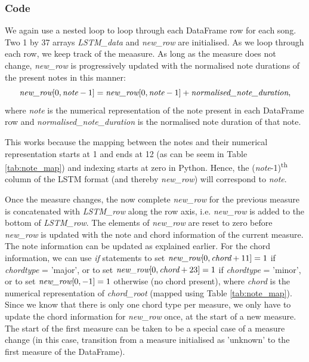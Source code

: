 \subsubsection{Code}
We again use a nested loop to loop through each DataFrame row for each song. Two 1 by 37 arrays \emph{LSTM\_data} and \emph{new\_row} are initialised. As we loop through each row, we keep track of the meaasure. As long as the measure does not change, \emph{new\_row} is progressively updated with the normalised note durations of the present notes in this manner: 
\begin{equation}  
\emph{new\_row}[0,\emph{note}-1] = \emph{new\_row}[0,\emph{note}-1] + \emph{normalised\_note\_duration},
\end{equation}
where \emph{note} is the numerical representation of the note present in each DataFrame row and \emph{normalised\_note\_duration} is the normalised note duration of that note. 

This works because the mapping between the notes and their numerical representation starts at 1 and ends at 12 (as can be seem in Table \ref{tab:note_map}) and indexing starts at zero in Python. Hence, the (\emph{note}-1)\textsuperscript{th} column of the LSTM format (and thereby \emph{new\_row}) will correspond to \emph{note}.

Once the measure changes, the now complete \emph{new\_row} for the previous measure is concatenated with \emph{LSTM\_row} along the row axis, i.e. \emph{new\_row} is added to the bottom of \emph{LSTM\_row}. The elements of \emph{new\_row} are reset to zero before \emph{new\_row} is updated with the note and chord information of the current measure. The note information can be updated as explained earlier. For the chord information, we can use \emph{if} statements to set $\emph{new\_row}[0, \emph{chord}+11] = 1$ if \emph{chordtype} = 'major', or to set $\emph{new\_row}[0, \emph{chord}+23] = 1$ if \emph{chordtype} = 'minor', or to set $\emph{new\_row}[0, -1] = 1$ otherwise (no chord present), where \emph{chord} is the numerical representation of \emph{chord\_root} (mapped using Table \ref{tab:note_map}). Since we know that there is only one chord type per measure, we only have to update the chord information for \emph{new\_row} once, at the start of a new measure. The start of the first measure can be taken to be a special case of a measure change (in this case, transition from a measure initialised as 'unknown' to the first measure of the DataFrame).

